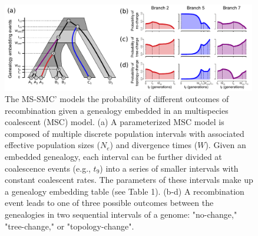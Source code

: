 \documentclass[11pt]{article}
\begin{document}


\begin{figure}
	\centering
	\includegraphics[width=0.99\textwidth]{figures/Fig1-embedding-and-probs-fill.pdf}
	\caption{
		The MS-SMC' models the probability of different outcomes of recombination
		given a genealogy embedded in an multispecies coalescent (MSC) model.
		(a) A parameterized MSC model is composed of multiple discrete population
		intervals with associated effective population sizes ($N_e$) and divergence 
		times ($W$). Given an embedded genealogy, each interval can be further divided 
		at coalescence events (e.g., $t_9$) into a series of smaller intervals
		with constant coalescent rates. The parameters of these intervals make up a 
		genealogy embedding table (see Table 1).
		(b-d) A recombination event leads to one of three possible outcomes 
		between the genealogies in two sequential intervals of a genome: 
		"no-change," "tree-change," or "topology-change". 
}
\end{figure}
\end{document}
